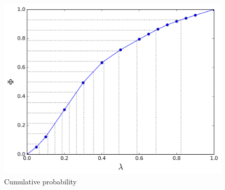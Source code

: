 \begin{figure}[h]
\centering
\includegraphics[width=0.7\linewidth]{Figures/optimized_cdf}
\caption{Cumulative probability}
\label{fig:optimized_cdf}
\end{figure}


